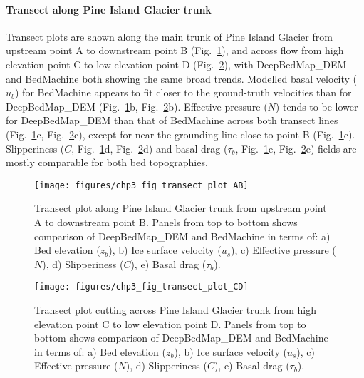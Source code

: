 \paragraph{Transect along Pine Island Glacier trunk}

Transect plots are shown along the main trunk of Pine Island Glacier from upstream point A to downstream point B (Fig.~\ref{fig:transect_AB}), and across flow from high elevation point C to low elevation point D (Fig.~\ref{fig:transect_CD}), with DeepBedMap\_DEM \citep{LeongDeepBedMap2020} and BedMachine \citep{MorlighemMEaSUREsBedMachineAntarctica2020} both showing the same broad trends.
Modelled basal velocity ($u_b$) for BedMachine appears to fit closer to the ground-truth velocities \citep{MouginotMEaSUREsPhaseMap2019} than for DeepBedMap\_DEM (Fig.~\ref{fig:transect_AB}b, Fig.~\ref{fig:transect_CD}b).
Effective pressure ($N$) tends to be lower for DeepBedMap\_DEM than that of BedMachine across both transect lines (Fig.~\ref{fig:transect_AB}c, Fig.~\ref{fig:transect_CD}c), except for near the grounding line close to point B (Fig.~\ref{fig:transect_AB}c).
Slipperiness ($C$, Fig.~\ref{fig:transect_AB}d, Fig.~\ref{fig:transect_CD}d) and basal drag ($\tau_b$, Fig.~\ref{fig:transect_AB}e, Fig.~\ref{fig:transect_CD}e) fields are mostly comparable for both bed topographies.

\begin{figure}[htbp]
  \texttt{[image: figures/chp3\_fig\_transect\_plot\_AB]}
  \caption[Transect plot along Pine Island Glacier trunk]{
    Transect plot along Pine Island Glacier trunk from upstream point A to downstream point B.
    Panels from top to bottom shows comparison of DeepBedMap\_DEM and BedMachine in terms of:
    a) Bed elevation ($z_b$),
    b) Ice surface velocity ($u_s$),
    c) Effective pressure ($N$),
    d) Slipperiness ($C$),
    e) Basal drag ($\tau_b$).
  }
  \label{fig:transect_AB}
\end{figure}

\begin{figure}[htbp]
  \texttt{[image: figures/chp3\_fig\_transect\_plot\_CD]}
  \caption[Transect plot cutting across Pine Island Glacier trunk]{
    Transect plot cutting across Pine Island Glacier trunk from high elevation point C to low elevation point D.
    Panels from top to bottom shows comparison of DeepBedMap\_DEM and BedMachine in terms of:
    a) Bed elevation ($z_b$),
    b) Ice surface velocity ($u_s$),
    c) Effective pressure ($N$),
    d) Slipperiness ($C$),
    e) Basal drag ($\tau_b$).
  }
  \label{fig:transect_CD}
\end{figure}


